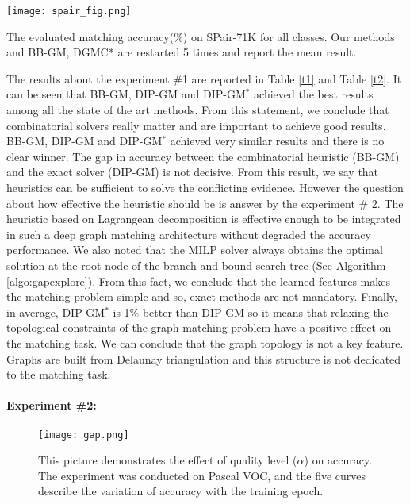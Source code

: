 \documentclass[times,onecolumn,final,authoryear]{article}
\theoremstyle{definition}
\begin{document}
\begin{table}[htbp]
    \centering
    \texttt{[image: spair\_fig.png]}
    \caption{The evaluated matching accuracy(\%) on SPair-71K for all classes. Our methods and BB-GM\cite{BB-GM}, DGMC*\cite{DGMC} are restarted 5 times and report the mean result.}
    \label{t2}
\end{table}

The results about the experiment \#1 are reported in Table \ref{t1} and Table \ref{t2}. It can be seen that BB-GM, DIP-GM and DIP-GM$^*$ achieved the best results among all the state of the art methods. From this statement, we conclude that combinatorial solvers really matter and are important to achieve good results. BB-GM, DIP-GM and DIP-GM$^*$ achieved very similar results and there is no clear winner. The gap in accuracy between the combinatorial heuristic (BB-GM) and the exact solver (DIP-GM) is not decisive. From this result, we say that heuristics can be sufficient to solve the conflicting evidence. However the question about how effective the heuristic should be is answer by the experiment \# 2. The heuristic based on Lagrangean decomposition \cite{DBLP:journals/corr/SwobodaRAKS16} is effective enough to be integrated in such a deep graph matching architecture without degraded the accuracy performance. We also noted that the MILP solver always obtains the optimal solution at the root node of the branch-and-bound search tree (See Algorithm \ref{algo:gapexplore}). From this fact, we conclude that the learned features makes the matching problem simple and so, exact methods are not mandatory. Finally, in average, DIP-GM$^*$ is 1\% better than DIP-GM so it means that relaxing the topological constraints of the graph matching problem have a positive effect on the matching task. We can conclude that the graph topology is not a key feature. Graphs are built from Delaunay triangulation and this structure is not dedicated to the matching task. %


\paragraph{Experiment \#2: }

\begin{figure}[htbp]
    \centering
    \texttt{[image: gap.png]}
    \caption{This picture demonstrates the effect of quality level ($\alpha$) on accuracy. The experiment was conducted on Pascal VOC, and the five curves describe the variation of accuracy with the training epoch.}
    \label{fig:2}
\end{figure}
\end{document}

